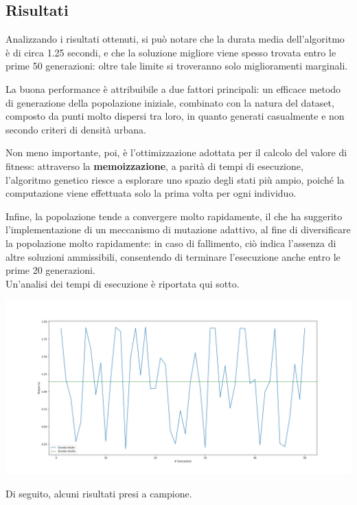 \documentclass{CSUniSchoolLabReport}
\begin{document}
\subsection{Risultati}

Analizzando i risultati ottenuti, si può notare che la durata media dell'algoritmo è di circa 1.25 secondi, e che la soluzione migliore viene spesso trovata entro le prime 50 generazioni: oltre tale limite si troveranno solo miglioramenti marginali. 

La buona performance è attribuibile a due fattori principali: un efficace metodo di generazione della popolazione iniziale, combinato con la natura del dataset, composto da punti molto dispersi tra loro, in quanto generati casualmente e non secondo criteri di densità urbana.

Non meno importante, poi, è l'ottimizzazione adottata per il calcolo del valore di fitness: attraverso la \textbf{memoizzazione}, a parità di tempi di esecuzione, l'algoritmo genetico riesce a esplorare uno spazio degli stati più ampio, poiché la computazione viene effettuata solo la prima volta per ogni individuo.

Infine, la popolazione tende a convergere molto rapidamente, il che ha suggerito l'implementazione di un meccanismo di mutazione adattivo, al fine di diversificare la popolazione molto rapidamente: in caso di fallimento, ciò indica l'assenza di altre soluzioni ammissibili, consentendo di terminare l'esecuzione anche entro le prime 20 generazioni. \\

Un'analisi dei tempi di esecuzione è riportata qui sotto. 

\begin{center}
	\includegraphics[scale=0.25]{results/esecuzioni}
\end{center}

Di seguito, alcuni risultati presi a campione.
\end{document}
